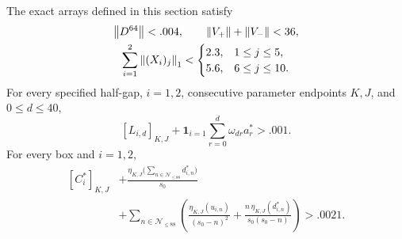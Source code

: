 \begin{proposition}\label{prop:finite-certificate}
The exact arrays defined in this section satisfy
\begin{equation}\label{eq:finite-norms}
\begin{gathered}
 \left\lVert D^{64}\right\rVert<.004,\qquad \left\lVert V_+\right\rVert+\left\lVert V_-\right\rVert<36,\\
 \sum_{i=1}^2\left\lVert(X_i)_j\right\rVert_1<
 \begin{cases}2.3,&1\le j\le5,\\5.6,&6\le j\le10.\end{cases}
\end{gathered}
\end{equation}
For every specified half-gap, $i=1,2$, consecutive parameter endpoints
$K,J$, and $0\le d\le40$,
\begin{equation}\label{eq:bernstein-certificate}
 [L_{i,d}]_{K,J}
 +\mathbf1_{i=1}\sum_{r=0}^d\omega_{dr}a_r^*>.001.
\end{equation}
For every box and $i=1,2$,
\begin{equation}\label{eq:tail-certificate}
\begin{split}
 [C_i^*]_{K,J}
 &+\frac{\eta_{K,J}\bigl(\sum_{n\in\mathcal N_{\le88}}d^*_{i,n}\bigr)}{s_0}\\
 &+\sum_{n\in\mathcal N_{\le88}}\left(
 \frac{\eta_{K,J}(u_{i,n})}{(s_0-n)^2}
 +\frac{n\,\eta_{K,J}(d^*_{i,n})}{s_0(s_0-n)}\right)>.0021.
\end{split}
\end{equation}
\end{proposition}

